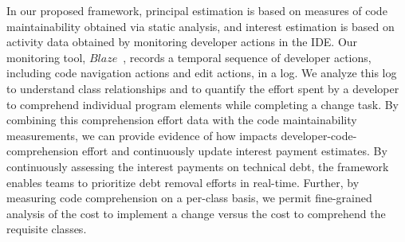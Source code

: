 In our proposed framework, principal estimation is based on measures of code maintainability obtained via static analysis, and interest estimation is based on activity data obtained by monitoring developer actions in the IDE. Our monitoring tool, $Blaze$~\cite{Snipes_etal:2014}, records a temporal sequence of developer actions, including code navigation actions and edit actions, in a log. We analyze this log to understand class relationships and to quantify the effort spent by a developer to comprehend individual program elements while completing a change task. By combining this comprehension effort data with the code maintainability measurements, we can provide evidence of how \TD impacts developer-code-comprehension effort and continuously update interest payment estimates.
By continuously assessing the interest payments on technical debt, the framework enables teams to prioritize debt removal efforts in real-time.  Further, by measuring code comprehension on a per-class basis, we permit fine-grained analysis of the cost to implement a change versus the cost to comprehend the requisite classes. %